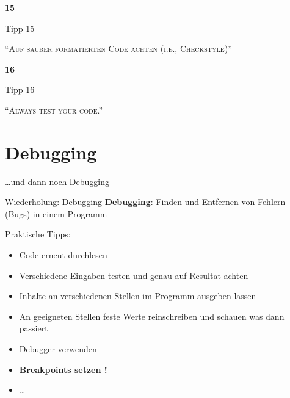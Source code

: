 \documentclass[18pt]{beamer}
\newcommand{\quotes}[1]{``#1''}
\begin{document}
\begin{frame}{\quad}
    \center
    \Huge{\textbf{15}}
\end{frame}

\begin{frame}{Tipp 15}
    \begin{block}{}
        \center
        \textsc{\quotes{Auf sauber formatierten Code achten (i.e., Checkstyle)}}
    \end{block}
\end{frame}

\begin{frame}{\quad}
    \center
    \Huge{\textbf{16}}
\end{frame}

\begin{frame}{Tipp 16}
    \begin{block}{}
        \center
        \textsc{\quotes{Always test your code.}}
    \end{block}
\end{frame}

\section{Debugging}

\begin{frame}{\quad}
    \center
    \Huge{\dots und dann noch Debugging}
\end{frame}

\begin{frame}{Wiederholung: Debugging}
    \textbf{Debugging}: Finden und Entfernen von Fehlern (Bugs) in einem Programm

    Praktische Tipps:
    \begin{itemize}
        \item Code erneut durchlesen
        \item Verschiedene Eingaben testen und genau auf Resultat achten
        \item Inhalte an verschiedenen Stellen im Programm ausgeben lassen
        \item An geeigneten Stellen feste Werte reinschreiben und schauen was dann passiert
        \item Debugger verwenden
        \item \textbf{Breakpoints setzen !}
        \item \dots
    \end{itemize}
\end{frame}
\end{document}
